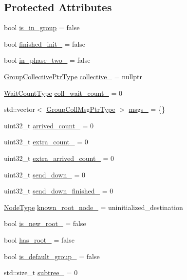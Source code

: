 \subsection*{Protected Attributes}
\begin{DoxyCompactItemize}
\item 
bool \hyperlink{structvt_1_1group_1_1_info_coll_a0a6bdffd7fc61b4e3817673d0a4b9ea9}{is\+\_\+in\+\_\+group} = false
\item 
bool \hyperlink{structvt_1_1group_1_1_info_coll_a46f40eb8a2394642b362b08024454af0}{finished\+\_\+init\+\_\+} = false
\item 
bool \hyperlink{structvt_1_1group_1_1_info_coll_ae96c291d014d6b27cc385d66e50a406f}{in\+\_\+phase\+\_\+two\+\_\+} = false
\item 
\hyperlink{structvt_1_1group_1_1_info_coll_a96f3e779eb522034ee3db6c93b3f4c6b}{Group\+Collective\+Ptr\+Type} \hyperlink{structvt_1_1group_1_1_info_coll_a36715c6570b0b82320b42f43932881d3}{collective\+\_\+} = nullptr
\item 
\hyperlink{structvt_1_1group_1_1_info_base_a0924de8df3a2ec72ebdd499ad8a28abf}{Wait\+Count\+Type} \hyperlink{structvt_1_1group_1_1_info_coll_a960af04b6804a2000017f9358b689c02}{coll\+\_\+wait\+\_\+count\+\_\+} = 0
\item 
std\+::vector$<$ \hyperlink{structvt_1_1group_1_1_info_coll_a1fcdc451e1e99aedebf302b234c529a6}{Group\+Coll\+Msg\+Ptr\+Type} $>$ \hyperlink{structvt_1_1group_1_1_info_coll_a30fc9a06654d5213b3355834938d6034}{msgs\+\_\+} = \{\}
\item 
uint32\+\_\+t \hyperlink{structvt_1_1group_1_1_info_coll_aceffca2aa6280f325f394e1e64ebc130}{arrived\+\_\+count\+\_\+} = 0
\item 
uint32\+\_\+t \hyperlink{structvt_1_1group_1_1_info_coll_a5996d9af993d2ef3a75d08adf6afa43c}{extra\+\_\+count\+\_\+} = 0
\item 
uint32\+\_\+t \hyperlink{structvt_1_1group_1_1_info_coll_ae15aee7207e11a978f327afa1024f7c8}{extra\+\_\+arrived\+\_\+count\+\_\+} = 0
\item 
uint32\+\_\+t \hyperlink{structvt_1_1group_1_1_info_coll_ad855e1491e7893d3be38084427736895}{send\+\_\+down\+\_\+} = 0
\item 
uint32\+\_\+t \hyperlink{structvt_1_1group_1_1_info_coll_ab550c62eb0f12b06332058ef0ac6b2fd}{send\+\_\+down\+\_\+finished\+\_\+} = 0
\item 
\hyperlink{namespacevt_a866da9d0efc19c0a1ce79e9e492f47e2}{Node\+Type} \hyperlink{structvt_1_1group_1_1_info_coll_a89e612584c480324a5d11c2c5d672c81}{known\+\_\+root\+\_\+node\+\_\+} = uninitialized\+\_\+destination
\item 
bool \hyperlink{structvt_1_1group_1_1_info_coll_a51b12694202a7bef872694ed9b2f6be3}{is\+\_\+new\+\_\+root\+\_\+} = false
\item 
bool \hyperlink{structvt_1_1group_1_1_info_coll_abc9bebfacc0a99ea16893fce55bf8ffe}{has\+\_\+root\+\_\+} = false
\item 
bool \hyperlink{structvt_1_1group_1_1_info_coll_ab08014fe1c28b172fc4b2b68a5fbc2a1}{is\+\_\+default\+\_\+group\+\_\+} = false
\item 
std\+::size\+\_\+t \hyperlink{structvt_1_1group_1_1_info_coll_a42a225abb3f2d734ae4eddaecdb56b9e}{subtree\+\_\+} = 0
\end{DoxyCompactItemize}
